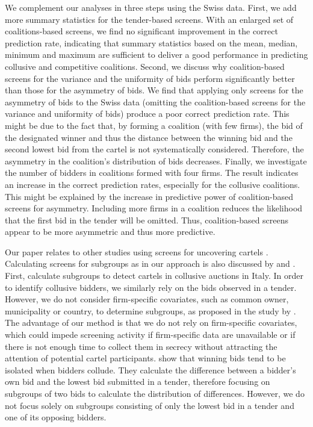 \documentclass[a4paper,11pt]{article}
\begin{document}
	We complement our analyses in three steps using the Swiss data. First, we add more summary statistics for the tender-based screens. With an enlarged set of coalitions-based screens, we find no significant improvement in the correct prediction rate, indicating that summary statistics based on the mean, median, minimum and maximum are sufficient to deliver a good performance in predicting collusive and competitive coalitions. Second, we discuss why coalition-based screens for the variance and the uniformity of bids perform significantly better than those for the asymmetry of bids. We find that applying only screens for the asymmetry of bids to the Swiss data (omitting the coalition-based screens for the variance and uniformity of bids) produce a poor correct prediction rate. This might be due to the fact that, by forming a coalition (with few firms), the bid of the designated winner and thus the distance between the winning bid and the second lowest bid from the cartel is not systematically considered. Therefore, the asymmetry in the coalition's distribution of bids decreases. Finally, we investigate the number of bidders in coalitions formed with four firms. The result indicates an increase in the correct prediction rates, especially for the collusive coalitions. This might be explained by the increase in predictive power of coalition-based screens for asymmetry. Including more firms in a coalition reduces the likelihood that the first bid in the tender will be omitted. Thus, coalition-based screens appear to be more asymmetric and thus more predictive. 
	
	Our paper relates to other studies using screens for uncovering cartels \citep[see][]{Abrantes2006, Esposito2006, Hueschelrath2011, Jimenez2012, Abrantes2012, huber2019machine, imhof2019detecting}. Calculating screens for subgroups as in our approach is also discussed by \citet{conley2016detecting} and \citet{Chassang2020}. First, \citet{conley2016detecting} calculate subgroups to detect cartels in collusive auctions in Italy. In order to identify collusive bidders, we similarly rely on the bids observed in a tender. However, we do not consider firm-specific covariates, such as common owner, municipality or country, to determine subgroups, as proposed in the study by \citet{conley2016detecting}. The advantage of our method is that we do not rely on firm-specific covariates, which could impede screening activity if firm-specific data are unavailable or if there is not enough time to collect them in secrecy without attracting the attention of potential cartel participants. \citet{Chassang2020} show that winning bids tend to be isolated when bidders collude. They calculate the difference between a bidder’s own bid and the lowest bid submitted in a tender, therefore focusing on subgroups of two bids to calculate the distribution of differences. However, we do not focus solely on subgroups consisting of only the lowest bid in a tender and one of its opposing bidders.
	
\end{document}

